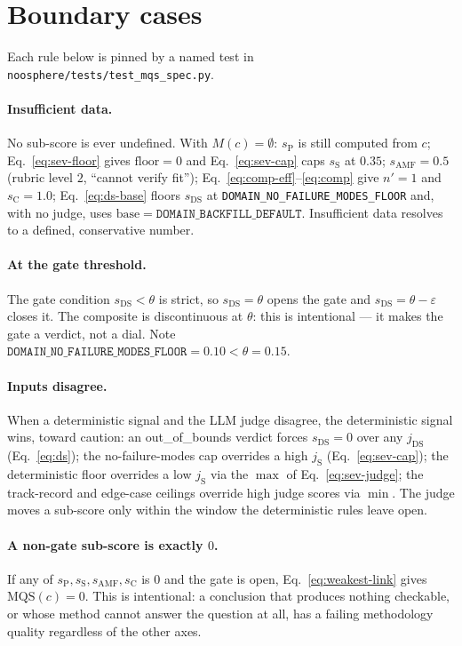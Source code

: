 \documentclass[11pt]{article}
\newcommand{\sP}{s_{\mathrm{P}}}
\newcommand{\sS}{s_{\mathrm{S}}}
\newcommand{\sAMF}{s_{\mathrm{AMF}}}
\newcommand{\sC}{s_{\mathrm{C}}}
\newcommand{\sDS}{s_{\mathrm{DS}}}
\newcommand{\code}[1]{\texttt{#1}}
\begin{document}
\section{Boundary cases}
\label{sec:boundary}

Each rule below is pinned by a named test in
\code{noosphere/tests/test\_mqs\_spec.py}.

\paragraph{Insufficient data.} No sub-score is ever undefined. With
$M(c) = \emptyset$: $\sP$ is still computed from $c$;
Eq.~\eqref{eq:sev-floor} gives $\mathrm{floor}=0$ and Eq.~\eqref{eq:sev-cap}
caps $\sS$ at $0.35$; $\sAMF = 0.5$ (rubric level $2$, ``cannot verify fit'');
Eq.~\eqref{eq:comp-eff}--\eqref{eq:comp} give $n'=1$ and $\sC = 1.0$;
Eq.~\eqref{eq:ds-base} floors $\sDS$ at \texttt{DOMAIN\_NO\_FAILURE\_MODES\_FLOOR}
and, with no judge, uses $\mathrm{base} = \texttt{DOMAIN\_BACKFILL\_DEFAULT}$.
Insufficient data resolves to a defined, conservative number.

\paragraph{At the gate threshold.} The gate condition $\sDS < \theta$ is
strict, so $\sDS = \theta$ opens the gate and $\sDS = \theta - \varepsilon$
closes it. The composite is discontinuous at $\theta$: this is intentional ---
it makes the gate a verdict, not a dial. Note
$\texttt{DOMAIN\_NO\_FAILURE\_MODES\_FLOOR} = 0.10 < \theta = 0.15$.

\paragraph{Inputs disagree.} When a deterministic signal and the LLM judge
disagree, the deterministic signal wins, toward caution: an
\textsf{out\_of\_bounds} verdict forces $\sDS = 0$ over any $j_{\mathrm{DS}}$
(Eq.~\eqref{eq:ds}); the no-failure-modes cap overrides a high $j_{\mathrm{S}}$
(Eq.~\eqref{eq:sev-cap}); the deterministic floor overrides a low
$j_{\mathrm{S}}$ via the $\max$ of Eq.~\eqref{eq:sev-judge}; the track-record
and edge-case ceilings override high judge scores via $\min$. The judge moves
a sub-score only within the window the deterministic rules leave open.

\paragraph{A non-gate sub-score is exactly $0$.} If any of $\sP, \sS, \sAMF,
\sC$ is $0$ and the gate is open, Eq.~\eqref{eq:weakest-link} gives
$\mathrm{MQS}(c) = 0$. This is intentional: a conclusion that produces nothing
checkable, or whose method cannot answer the question at all, has a failing
methodology quality regardless of the other axes.
\end{document}

